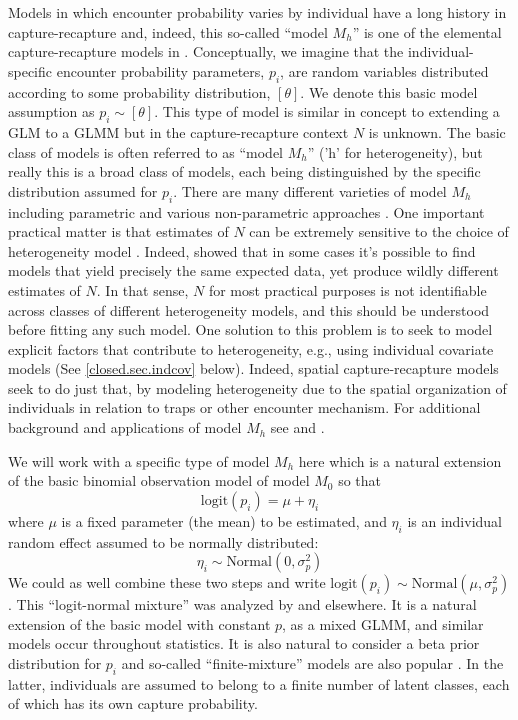 Models in which encounter probability varies by individual have a long
history in capture-recapture and, indeed, this so-called ``model
$M_h$'' is one of the elemental capture-recapture models in
\citep{otis_etal:1978}. Conceptually, we imagine that the
individual-specific encounter probability parameters, $p_{i}$, are
random variables distributed according to some probability
distribution, $[\theta]$. We denote this basic model assumption as
$p_{i} \sim [\theta]$. This type of model is similar in concept to
extending a GLM to a GLMM but in the capture-recapture context $N$ is
unknown.  The basic class of models is often referred to as ``model
$M_h$'' ('h' for heterogeneity), but really this is a broad class of
models, each being distinguished by the specific distribution assumed
for $p_{i}$.  There are many different varieties of model $M_{h}$
including parametric and various non-parametric approaches
\citep{burnham_overton:1978, norris_pollock:1996, pledger:2000}. One
important practical matter is that estimates of $N$ can be extremely
sensitive to the choice of heterogeneity model
\citep{fienberg_etal:1999, dorazio_royle:2003, link:2003}. Indeed,
\citet{link:2003} showed that in some cases it's possible to find
models that yield precisely the same expected data, yet produce wildly
different estimates of $N$. In that sense, $N$ for most practical
purposes is not identifiable across classes of different heterogeneity
models, and this should be understood before fitting any such
model. One solution to this problem is to seek to model explicit
factors that contribute to heterogeneity, e.g., using individual
covariate models (See \ref{closed.sec.indcov} below). Indeed, spatial
capture-recapture models seek to do just that, by modeling
heterogeneity due to the spatial organization of individuals in
relation to traps or other encounter mechanism.  For additional
background and applications of model $M_{h}$ see
\citet[][Chapt. 6]{royle_dorazio:2008} and
\citet[][Chapt. 6]{kery_schaub:2011}.

We will work with a specific type of model $M_{h}$ here which is a
natural extension of
the basic binomial observation model of model $M_{0}$ so
that
\[
\mbox{logit}(p_{i}) = \mu + \eta_{i}
\]
where $\mu$ is a fixed parameter (the mean) to be estimated, and
$\eta_{i}$ is an individual random effect assumed to be normally distributed:
\[
\eta_{i} \sim \mbox{Normal}(0, \sigma_{p}^2)
\]
We could as well combine these two steps and write $\mbox{logit}(p_{i}) \sim \mbox{Normal}(\mu,\sigma_{p}^2)$.
This ``logit-normal mixture'' was analyzed by
\citet{coull_agresti:1999} and elsewhere. It is a natural extension of
the basic model with constant $p$, as a mixed GLMM, and similar models
occur throughout statistics. It is also natural to consider a beta
prior distribution for $p_{i}$ \citep{dorazio_royle:2003} and
so-called ``finite-mixture'' models are also popular
\citep{norris_pollock:1996, pledger:2000}. In the latter, individuals
are assumed to belong to a finite number of latent classes, each of
which has its own capture probability.


